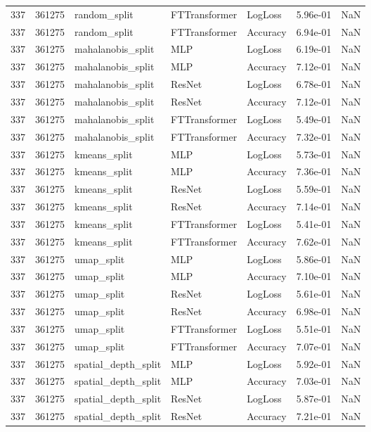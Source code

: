 \begin{tabular}{rrlllrr}
337 & 361275 & random\_split & FTTransformer & LogLoss & 5.96e-01 & NaN \\
337 & 361275 & random\_split & FTTransformer & Accuracy & 6.94e-01 & NaN \\
337 & 361275 & mahalanobis\_split & MLP & LogLoss & 6.19e-01 & NaN \\
337 & 361275 & mahalanobis\_split & MLP & Accuracy & 7.12e-01 & NaN \\
337 & 361275 & mahalanobis\_split & ResNet & LogLoss & 6.78e-01 & NaN \\
337 & 361275 & mahalanobis\_split & ResNet & Accuracy & 7.12e-01 & NaN \\
337 & 361275 & mahalanobis\_split & FTTransformer & LogLoss & 5.49e-01 & NaN \\
337 & 361275 & mahalanobis\_split & FTTransformer & Accuracy & 7.32e-01 & NaN \\
337 & 361275 & kmeans\_split & MLP & LogLoss & 5.73e-01 & NaN \\
337 & 361275 & kmeans\_split & MLP & Accuracy & 7.36e-01 & NaN \\
337 & 361275 & kmeans\_split & ResNet & LogLoss & 5.59e-01 & NaN \\
337 & 361275 & kmeans\_split & ResNet & Accuracy & 7.14e-01 & NaN \\
337 & 361275 & kmeans\_split & FTTransformer & LogLoss & 5.41e-01 & NaN \\
337 & 361275 & kmeans\_split & FTTransformer & Accuracy & 7.62e-01 & NaN \\
337 & 361275 & umap\_split & MLP & LogLoss & 5.86e-01 & NaN \\
337 & 361275 & umap\_split & MLP & Accuracy & 7.10e-01 & NaN \\
337 & 361275 & umap\_split & ResNet & LogLoss & 5.61e-01 & NaN \\
337 & 361275 & umap\_split & ResNet & Accuracy & 6.98e-01 & NaN \\
337 & 361275 & umap\_split & FTTransformer & LogLoss & 5.51e-01 & NaN \\
337 & 361275 & umap\_split & FTTransformer & Accuracy & 7.07e-01 & NaN \\
337 & 361275 & spatial\_depth\_split & MLP & LogLoss & 5.92e-01 & NaN \\
337 & 361275 & spatial\_depth\_split & MLP & Accuracy & 7.03e-01 & NaN \\
337 & 361275 & spatial\_depth\_split & ResNet & LogLoss & 5.87e-01 & NaN \\
337 & 361275 & spatial\_depth\_split & ResNet & Accuracy & 7.21e-01 & NaN \\

\end{tabular}
